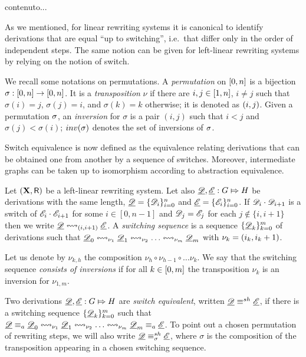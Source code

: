 \begin{corollary}
	contenuto...
\end{corollary}


As we mentioned, for linear rewriting systems
it is canonical to identify
derivations that are equal ``up to switching'', i.e.~that differ
only in the order of independent steps. The same notion can be given
for left-linear rewriting systems by relying on the notion of switch.

We  recall some notations on permutations.  A \emph{permutation} on
$\interval[0]{n}$ is a bijection
$\sigma : \interval[0]{n} \to \interval[0]{n}$. It is a
\emph{transposition} $\nu$ if there are $i, j \in \interval{n}$,
$i \neq j$ such that $\sigma(i)=j$, $\sigma(j) = i$, and
$\sigma(k) = k$ otherwise; it is denoted as $\transp{i}[j]$. Given a permutation $\perm$, 
an \emph{inversion} for $\sigma$ is a pair $(i,j)$ such that $i<j$ and
$\sigma(j)< \sigma(i)$; $\inv{\sigma}$ denotes the set of
inversions of $\perm$.

Switch equivalence is now defined as the equivalence relating derivations that 
can be obtained one from another by a sequence of switches. Moreover, intermediate graphs can be taken up to isomorphism according to abstraction equivalence.

\begin{definition}
	\label{de:switch-equivalence}
	Let $(\X, \R)$ be a left-linear rewriting system.  Let also
	$\der{D}, \der{E} : G \Mapsto H$ be derivations with the same
	length, $\der{D}=\{\dder{D}_{i}\}_{i=0}^n$ and
	$\der{E}=\{\dder{E}_{i}\}_{i=0}^n$. If
	$\dder{D}_i \cdot \dder{D}_{i+1}$ is a switch of
	$\dder{E}_i \cdot \dder{E}_{i+1}$ for some $i \in [0,n-1]$ and  $\dder{D}_j = \dder{E}_j$ for each $j \not \in \{i,i+1\}$ then we write
	$\der{D} \shift{\transp{i}} \der{E}$. 
	A \emph{switching sequence} is a sequence $\{\der{D}_{k}\}_{k=0}^m$
	of derivations such that
	$\der{D}_0 \shift{\nu_1} \der{D}_1 \shift{\nu_2} \ldots
	\shift{\nu_m} \der{D}_m$  with $\nu_{k} = \transp{i_k}$.
	
	Let us denote by $\nu_{k,h}$ the composition
	$\nu_h \circ \nu_{h-1} \circ \ldots \nu_k$. We say that the
	switching sequence \emph{consists of inversions} if for all
	$k \in \interval[0]{m}$ the transposition $\nu_k$ is an inversion
	for $\nu_{1,m}$.
	
	Two derivations $\der{D}, \der{E}:G\Mapsto H$ are \emph{switch
		equivalent}, written $\der{D}\equiv^{sh} \der{E}$, if there is a
	switching sequence $\{\der{D}_{k}\}_{k=0}^m$ such that
	$\der{D}\equiv_a \der{D}_0 \shift{\nu_1} \der{D}_1 \shift{\nu_2}
	\ldots \shift{\nu_m} \der{D}_m \equiv _a \der{E}$.   
	To point out a chosen permutation of rewriting steps, we will also write $\der{D}\equiv^{sh}_{\sigma} \der{E}$, 
	where $\sigma$ is the composition of the transposition appearing in a chosen switching sequence. 
\end{definition}





